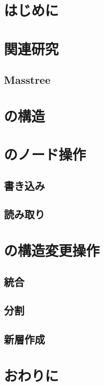 
\section{はじめに}

\section{関連研究}
\label{sec:relatedwork}

\subsection{\Bctree{}}
\subsection{Masstree}

\section{\Bcforest{}の構造}
\label{sec:bc_forest_structure}

\section{\Bcforest{}のノード操作}
\label{sec:node_operation}

\subsection{書き込み}
\subsection{読み取り}

\section{\Bcforest{}の構造変更操作}
\label{sec:smo}

\subsection{統合}
\subsection{分割}
\subsection{新層作成}

\section{おわりに}
\label{sec:conclusion}

